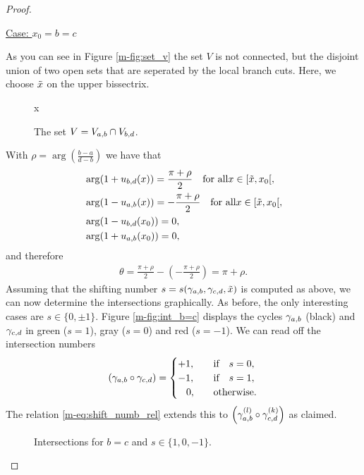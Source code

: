 \documentclass[main.tex]{subfiles}
\begin{document}
\begin{proof}
\begin{itemize}
  \begin{center}
   \underline{Case: $x_0 = b = c$}
  \end{center}
  As you can see in Figure \ref{m-fig:set_v} the set $V$ is not connected, but the disjoint union of two open sets that are seperated by the local branch cuts. Here, we choose $\tilde{x}$ on the upper bissectrix.
   \begin{figure}[H]
      \begin{center}
   
      \end{center}x
    \caption{The set $V = V_{a,b} \cap V_{b,d}$.}
    \label{fig:set_v}
\end{figure}
  With $\rho = \arg\left(\frac{b-a}{d-b}\right)$ we have that
  \begin{align*}
   & \arg (1+u_{b,d}(x)) = \frac{\pi+\rho}{2} \quad \text{for all}  x \in [\tilde{x},x_0[,\\
   & \arg (1-u_{a,b}(x)) = -\frac{\pi+\rho}{2} \quad \text{for all}  x \in [\tilde{x},x_0[,\\
   & \arg (1-u_{b,d}(x_0)) = 0,\\
   & \arg (1+u_{a,b}(x_0))= 0,
  \end{align*}
  and therefore
  \begin{align*}
   \theta = \frac{\pi+\rho}{2} - \left(-\frac{\pi+\rho}{2}\right) = \pi + \rho.
  \end{align*}
  Assuming that the shifting number $s=s(\gamma_{a,b},\gamma_{c,d},\tilde{x})$ is computed as above, we can now determine the intersections graphically. \abstandl
  As before, the only interesting cases
  are $s \in \{0,\pm 1\}$. Figure \ref{m-fig:int_b=c} displays the cycles $\gamma_{a,b}$ (black) and $\gamma_{c,d}$ in green ($s=1$), gray ($s=0$) and red ($s=-1$).
  We can read off the intersection numbers
  \begin{align*}
    \left(\gamma_{a,b} \circ \gamma_{c,d}\right) = \begin{cases}
                                          +1, \quad & \text{if} \quad s=0,\\
                                          -1, \quad & \text{if} \quad s=1,\\
                                          \quad\!0, \quad & \text{otherwise}.
                                         \end{cases}
  \end{align*}
  The relation \eqref{m-eq:shift_numb_rel} extends this to $\left(\gamma_{a,b}^{(l)} \circ \gamma_{c,d}^{(k)}\right)$ as claimed.
  \begin{figure}[H]
      \begin{center}
   
      \end{center}
    \caption{Intersections for $b=c$ and $s \in \{1,0,-1\}$.}
    \label{fig:int_b=c}
\end{figure}
 \end{itemize}
  \end{proof}
\end{document}
